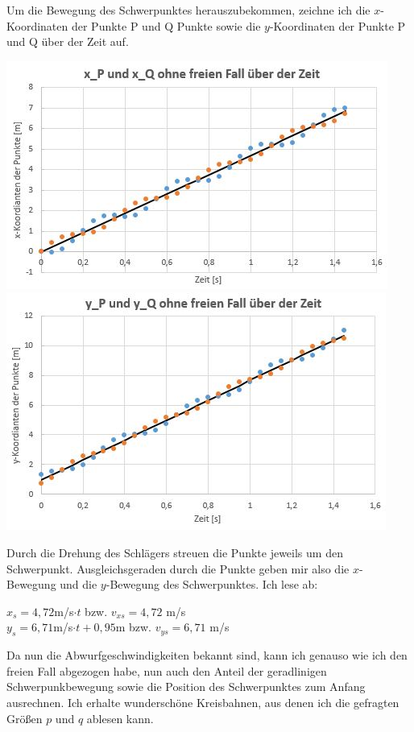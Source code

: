 \documentclass{article}
\begin{document}
Um die Bewegung des Schwerpunktes herauszubekommen, zeichne ich die $x$-Koordinaten der Punkte P und Q Punkte sowie die $y$-Koordinaten der Punkte P und Q über der Zeit auf. 
\begin{center}
	\includegraphics[scale=0.47]{x_s-ueber-Zeit.JPG}
	\includegraphics[scale=0.45]{y_s-ueber-Zeit.JPG}
\end{center}
Durch die Drehung des Schlägers streuen die Punkte jeweils um den Schwerpunkt. Ausgleichsgeraden durch die Punkte geben mir also die $x$-Bewegung und die $y$-Bewegung des Schwerpunktes.
Ich lese ab:
\begin{center}
	$x_s=4,72$m/s$\cdot t$ bzw. $ v_{xs} = 4,72$ m/s \\
	$y_s=6,71$m/s$\cdot t +0,95$m bzw. $ v_{ys} = 6,71$ m/s \\
\end{center}
Da nun die Abwurfgeschwindigkeiten bekannt sind, kann ich genauso wie ich den freien Fall abgezogen habe, nun auch den Anteil der geradlinigen Schwerpunkbewegung sowie die Position des Schwerpunktes zum Anfang ausrechnen.
Ich erhalte wunderschöne Kreisbahnen, aus denen ich die gefragten Größen $p$ und $q$ ablesen kann. 
\end{document}
